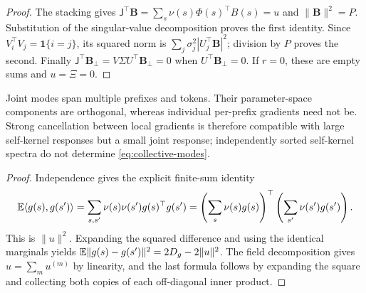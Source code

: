 \begin{proof}
The stacking gives $\mathsf J^\top\mathbf B=\sum_s\nu(s)\Phi(s)^\top B(s)=u$ and $\|\mathbf B\|^2=P$. Substitution of the singular-value decomposition proves the first identity. Since $V_i^\top V_j=\mathbf1\{i=j\}$, its squared norm is $\sum_j\sigma_j^2|U_j^\top\mathbf B|^2$; division by $P$ proves the second. Finally $\mathsf J^\top\mathbf B_\perp=V\Sigma U^\top\mathbf B_\perp=0$ when $U^\top\mathbf B_\perp=0$. If $r=0$, these are empty sums and $u=\Xi=0$.
\end{proof}

Joint modes span multiple prefixes and tokens. Their parameter-space components are orthogonal, whereas individual per-prefix gradients need not be. Strong cancellation between local gradients is therefore compatible with large self-kernel responses but a small joint response; independently sorted self-kernel spectra do not determine \cref{eq:collective-modes}.

\begin{proof}
Independence gives the explicit finite-sum identity
\[
 \mathbb{E}\langle g(s),g(s')\rangle
 =\sum_{s,s'}\nu(s)\nu(s')g(s)^\top g(s')
 =\left(\sum_s\nu(s)g(s)\right)^\top\left(\sum_{s'}\nu(s')g(s')\right).
\]
This is $\|u\|^2$. Expanding the squared difference and using the identical marginals yields $\mathbb{E}\|g(s)-g(s')\|^2=2D_g-2\|u\|^2$. The field decomposition gives $u=\sum_m u^{(m)}$ by linearity, and the last formula follows by expanding the square and collecting both copies of each off-diagonal inner product.
\end{proof}

